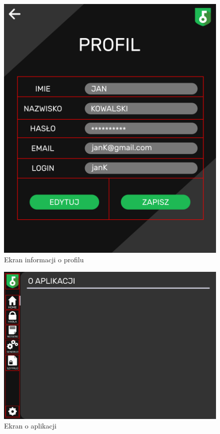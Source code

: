 \documentclass[a4paper]{article}
\begin{document}
\begin{figure}[H]
    \centering
    \includegraphics[height=1\textwidth]{img/ekran_profilu.png}
    \caption{Ekran informacji o profilu}
    \label{fig:profil}
\end{figure}

\begin{figure}[H]
    \centering
    \includegraphics[height=1\textwidth]{img/ekarn_oapp.png}
    \caption{Ekran o aplikacji}
    \label{fig:oApp}
\end{figure}
\end{document}
